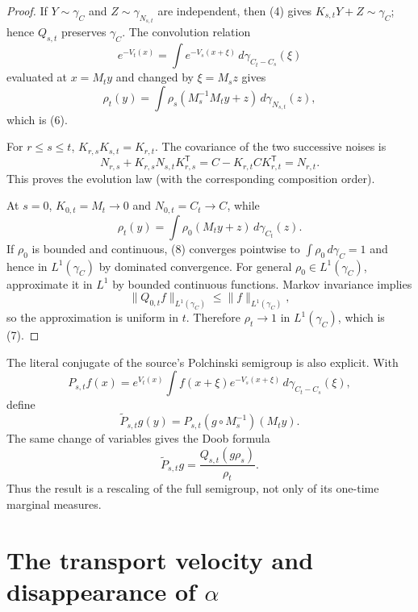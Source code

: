 \documentclass[11pt]{article}
\begin{document}
\begin{proof}
If $Y\sim\gamma_C$ and $Z\sim\gamma_{N_{s,t}}$ are independent, then
(4) gives
$K_{s,t}Y+Z\sim\gamma_C$; hence $Q_{s,t}$ preserves $\gamma_C$.
The convolution relation
\[
 e^{-V_t(x)}=\int e^{-V_s(x+\xi)}\,d\gamma_{C_t-C_s}(\xi)
\]
evaluated at $x=M_ty$ and changed by $\xi=M_sz$ gives
\[
 \rho_t(y)
 =\int\rho_s(M_s^{-1}M_ty+z)\,d\gamma_{N_{s,t}}(z),
\]
which is (6).

For $r\le s\le t$,
$K_{r,s}K_{s,t}=K_{r,t}$.  The covariance of the two successive noises is
\[
 N_{r,s}+K_{r,s}N_{s,t}K_{r,s}^{\mathsf T}
 =C-K_{r,t}CK_{r,t}^{\mathsf T}=N_{r,t}.
\]
This proves the evolution law (with the corresponding composition order).

At $s=0$, $K_{0,t}=M_t\to0$ and $N_{0,t}=C_t\to C$, while
\[
 \rho_t(y)=\int\rho_0(M_ty+z)\,d\gamma_{C_t}(z).                   \tag{8}
\]
If $\rho_0$ is bounded and continuous, (8) converges pointwise to
$\int\rho_0\,d\gamma_C=1$ and hence in $L^1(\gamma_C)$ by dominated
convergence.  For general $\rho_0\in L^1(\gamma_C)$, approximate it in
$L^1$ by bounded continuous functions.  Markov invariance implies
\[
 \|Q_{0,t}f\|_{L^1(\gamma_C)}\le\|f\|_{L^1(\gamma_C)},
\]
so the approximation is uniform in $t$.  Therefore
$\rho_t\to1$ in $L^1(\gamma_C)$, which is (7).
\end{proof}

The literal conjugate of the source's Polchinski semigroup is also explicit.
With
\[
 P_{s,t}f(x)=e^{V_t(x)}
   \int f(x+\xi)e^{-V_s(x+\xi)}\,d\gamma_{C_t-C_s}(\xi),
\]
define
\[
 \widetilde P_{s,t}g(y)
 =P_{s,t}(g\circ M_s^{-1})(M_ty).
\]
The same change of variables gives the Doob formula
\begin{equation*}
             \widetilde P_{s,t}g
             =\frac{Q_{s,t}(g\rho_s)}{\rho_t}.                     \tag{9}
\end{equation*}
Thus the result is a rescaling of the full semigroup, not only of its
one-time marginal measures.

\section*{The transport velocity and disappearance of $\alpha$}
\end{document}

